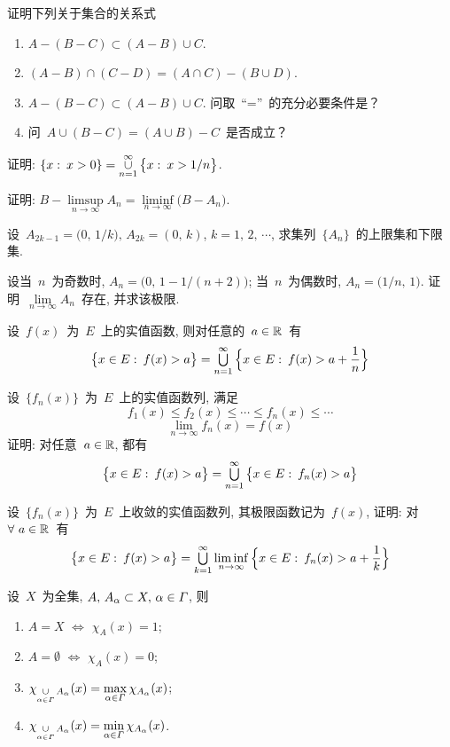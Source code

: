 \begin{problemset}

\item 证明下列关于集合的关系式
\begin{enumerate}
\item[(1)] $A - (B-C) \subset (A-B) \cup C$.
\item[(2)] $(A-B)\cap (C-D) = (A \cap C)-(B \cup D)$.
\item[(3)] $A - (B - C) \subset (A - B) \cup C$. 问取~``=''~的充分必要条件是？
\item[(4)] 问~$A \cup (B-C) = (A \cup B) - C$~是否成立？
\end{enumerate}

\item 证明: $\{x : \: x>0\} = \mathop{\cup}\limits_{n=1}^\infty \big\{x: \: x > 1/n \big\}$.

\item 证明: $B - \limsup\limits_{n \to \infty} A_n = \liminf\limits_{n \to \infty} \big(B - A_n\big)$.

\item 设~$A_{2k-1} = \big(0,\, 1/k\big), \, A_{2k} = (0,\,k)$, $k=1,\,2,\,\cdots$, 求集列~$\{A_n\}$~的上限集和下限集.

\item 设当~$n$~为奇数时, $A_n = \big(0,\,1- 1/(n+2)\big)$; 当~$n$~为偶数时, $A_n = \big(1/n,\,1\big)$. 证明~$\lim\limits_{n \to \infty} A_n$~存在, 并求该极限.

\item 设~$f(x)$~为~$E$~上的实值函数, 则对任意的~$a \in \mathbb{R}$~有
\[
\big\{x \in E: \: f(x) > a \big\} = \mathop{\textstyle{\bigcup}}_{n=1}^\infty \Big\{ x \in E: \: f(x) > a+ \frac{1}{n} \Big\}
\]

\item 设~$\{f_n(x)\}$~为~$E$~上的实值函数列, 满足
\[
f_1(x) \leqslant f_2(x) \leqslant \cdots \leqslant f_n(x) \leqslant \cdots
\]
\[
\lim_{n \to \infty} f_n(x) = f(x)
\]
证明: 对任意~$a \in \mathbb{R}$, 都有
\[
\big\{ x \in E: \: f(x) > a \big\} = \mathop{\textstyle{\bigcup}}_{n =1}^\infty \big\{ x \in E: \: f_n(x) > a \big\}
\]

\item 设~$\{f_n(x)\}$~为~$E$~上收敛的实值函数列, 其极限函数记为~$f(x)$, 证明: 对~$\forall~a \in \mathbb{R}$~有
\[
\big\{x \in E: \: f(x) > a \big\} = \mathop{\textstyle{\bigcup}}_{k=1}^\infty \liminf_{n \to \infty} \Big\{x \in E: \: f_n(x) > a+\frac{1}{k} \Big\}
\]

\item 设~$X$~为全集, $A, \, A_\alpha \subset X, \, \alpha \in \mathnormal{\Gamma}$, 则
\begin{enumerate}
\item[(1)] $A = X$ $\Longleftrightarrow$ $\chi_A(x) = 1$;
\item[(2)] $A = \emptyset$ $\Longleftrightarrow$ $\chi_A(x) = 0$;
\item[(3)] $\chi_{\mathop{\cup}\limits_{\alpha \in \mathnormal{\Gamma}} A_\alpha} (x) = \max\limits_{\alpha \in \mathnormal{\Gamma}} \chi_{A_\alpha} (x)$;
\item[(4)] $\chi_{\mathop{\cup}\limits_{\alpha \in \mathnormal{\Gamma}} A_\alpha} (x) = \min\limits_{\alpha \in \mathnormal{\Gamma}} \chi_{A_\alpha} (x)$.
\end{enumerate}


\end{problemset}
